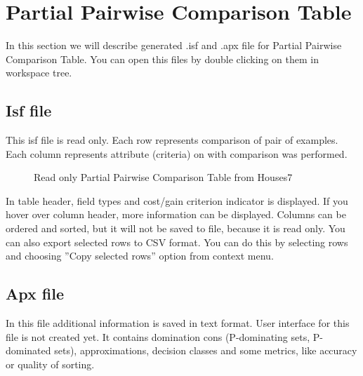 \section{Partial Pairwise Comparison Table}\label{section:pct}

In this section we will describe generated .isf and .apx file for Partial Pairwise Comparison Table. You can open this files by double clicking on them in workspace tree.

\subsection{Isf file}\label{sub:pct-isf}

This isf file is read only. Each row represents comparison of pair of examples. Each column represents attribute (criteria) on with comparison was performed.

\begin{figure*}[!ht] 
	\centering
	\caption{Read only Partial Pairwise Comparison Table from Houses7}
\end{figure*}

In table header, field types and cost/gain criterion indicator is displayed. If you hover over column header, more information can be displayed. Columns can be ordered and sorted, but it will not be saved to file, because it is read only. You can also export selected rows to CSV format. You can do this by selecting rows and choosing ''Copy selected rows'' option from context menu.

\subsection{Apx file}\label{sub:pct-apx}

In this file additional information is saved in text format. User interface for this file is not created yet. It contains domination cons (P-dominating sets, P-dominated sets), approximations, decision classes and some metrics, like accuracy or quality of sorting.

\vfill\newpage